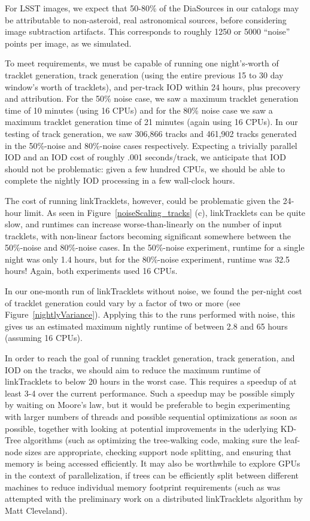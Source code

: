 For LSST images, we expect that 50-80\% of the DiaSources in our
catalogs may be attributable to non-asteroid, real astronomical sources, before
considering image subtraction artifacts.  This
corresponds to roughly 1250 or 5000 ``noise'' points per image, as we
simulated.

To meet requirements, we must be capable of running one night's-worth
of tracklet generation, track generation (using the entire previous
15 to 30 day window's worth of tracklets), and per-track IOD within 24
hours, plus precovery and attribution.  For the 50\% noise case, we saw a maximum tracklet generation
time of 10 minutes (using 16 CPUs) and for the 80\% noise case we saw
a maximum tracklet generation time of 21 minutes (again using 16
CPUs).  In our testing of track generation, we saw 306,866 tracks and
461,902 tracks generated in the 50\%-noise and 80\%-noise cases
respectively.  Expecting a trivially parallel IOD and an IOD cost of
roughly .001 seconds/track, we anticipate that IOD should not be
problematic: given a few hundred CPUs, we should be able to complete
the nightly IOD processing in a few wall-clock hours.

The cost of running linkTracklets, however, could be problematic given
the 24-hour limit.  As seen in Figure~\ref{noiseScaling_tracks} (c),
linkTracklets can be quite slow, and runtimes can increase
worse-than-linearly on the number of input tracklets, with non-linear
factors becoming significant somewhere between the 50\%-noise and
80\%-noise cases.  In the 50\%-noise experiment, runtime for a single
night was only 1.4 hours, but for the 80\%-noise experiment, runtime
was 32.5 hours!  Again, both experiments used 16 CPUs.  

In our one-month run of linkTracklets without noise, we found the
per-night cost of tracklet generation could vary by a factor of two or
more (see Figure~\ref{nightlyVariance}).  Applying this to the runs performed with noise, this gives us
an estimated maximum nightly runtime of between 2.8 and 65
hours (assuming 16 CPUs).

In order to reach the goal of running tracklet generation, track
generation, and IOD on the tracks, we should aim to reduce the maximum
runtime of linkTracklets to below 20 hours in the worst case.  This
requires a speedup of at least 3-4 over the current performance.  Such
a speedup may be possible simply by waiting on Moore's law, but it would be preferable to begin experimenting with
larger numbers of threads and possible sequential optimizations as
soon as possible, together with looking at potential improvements in
the uderlying KD-Tree algorithms (such as optimizing the tree-walking
code, making sure the leaf-node sizes are appropriate, checking
support node splitting, and ensuring that memory is being accessed
efficiently. It may also be worthwhile to explore GPUs in the context
of parallelization, if trees can be efficiently split between
different machines to reduce individual memory footprint
requirements (such as was attempted with the preliminary work on a
distributed linkTracklets algorithm by Matt Cleveland). 

